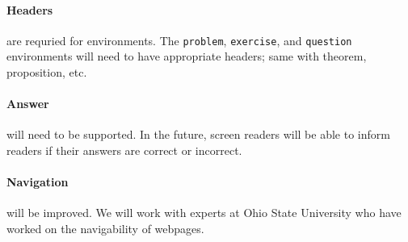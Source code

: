 \documentclass{ximera}
\begin{document}
\paragraph{Headers} are requried for environments.
The \verb!problem!, \verb!exercise!, and \verb!question! environments will need to have appropriate headers; same with theorem, proposition, etc. 


\paragraph{Answer} will need to be supported.
In the future, screen readers will be able to inform readers if their answers are correct or incorrect.  

\paragraph{Navigation} will be improved.
We will work with experts at Ohio State University who have worked on the navigability of webpages. 
\end{document}
